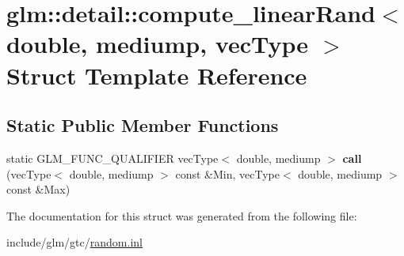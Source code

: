 \hypertarget{structglm_1_1detail_1_1compute__linearRand_3_01double_00_01mediump_00_01vecType_01_4}{}\section{glm\+:\+:detail\+:\+:compute\+\_\+linear\+Rand$<$ double, mediump, vec\+Type $>$ Struct Template Reference}
\label{structglm_1_1detail_1_1compute__linearRand_3_01double_00_01mediump_00_01vecType_01_4}
\subsection*{Static Public Member Functions}
\begin{DoxyCompactItemize}
\item 
\mbox{\label{structglm_1_1detail_1_1compute__linearRand_3_01double_00_01mediump_00_01vecType_01_4_a031b3fa7e6d9050f4d038c13239a71a7}} 
static G\+L\+M\+\_\+\+F\+U\+N\+C\+\_\+\+Q\+U\+A\+L\+I\+F\+I\+ER vec\+Type$<$ double, mediump $>$ {\bfseries call} (vec\+Type$<$ double, mediump $>$ const \&Min, vec\+Type$<$ double, mediump $>$ const \&Max)
\end{DoxyCompactItemize}


The documentation for this struct was generated from the following file\+:\begin{DoxyCompactItemize}
\item 
include/glm/gtc/\hyperlink{random_8inl}{random.\+inl}\end{DoxyCompactItemize}
